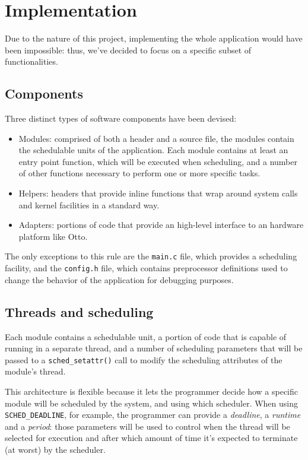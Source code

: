 \documentclass[a4paper,12pt]{report}
\begin{document}
\section{Implementation}

Due to the nature of this project, implementing the whole application would have been impossible: thus, we've decided to focus on a specific subset of functionalities.

\subsection{Components}

Three distinct types of software components have been devised:
\begin{itemize}
    \item Modules: comprised of both a header and a source file, the modules contain the schedulable units of the application. Each module contains at least an entry point function, which will be executed when scheduling, and a number of other functions necessary to perform one or more specific tasks.   
    \item Helpers: headers that provide inline functions that wrap around system calls and kernel facilities in a standard way.
    \item Adapters: portions of code that provide an high-level interface to an hardware platform like Otto.
\end{itemize}

The only exceptions to this rule are the \texttt{main.c} file, which provides a scheduling facility, and the \texttt{config.h} file, which contains preprocessor definitions used to change the behavior of the application for debugging purposes.

\subsection{Threads and scheduling}

Each module contains a schedulable unit, a portion of code that is capable of running in a separate thread, and a number of scheduling parameters that will be passed to a \texttt{sched\_setattr()} call to modify the scheduling attributes of the module's thread.

This architecture is flexible because it lets the programmer decide how a specific module will be scheduled by the system, and using which scheduler. When using \texttt{SCHED\_DEADLINE}, for example, the programmer can provide a \textit{deadline}, a \textit{runtime} and a \textit{period}: those parameters will be used to control when the thread will be selected for execution and after which amount of time it's expected to terminate (at worst) by the scheduler.
\end{document}
